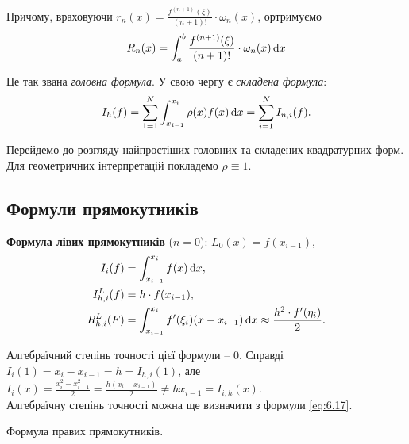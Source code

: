 Причому, враховуючи $r_n(x) = \frac{f^{(n + 1)}(\xi)}{(n + 1)!} \cdot \omega_n(x)$, ортримуємо
\begin{equation}
	\label{eq:6.12}
	R_n(x) = \int_a^b \frac{f^{(n + 1)}(\xi)}{(n + 1)!} \cdot \omega_n(x) \mathop{}\!\mathrm{d} x
\end{equation}

Це так звана \textit{головна формула}. У свою чергу є \textit{складена формула}:
\begin{equation}
	\label{eq:6.14}
	I_h(f) = \sum_{1 = 1}^N \int_{x_{i - 1}}^{x_i} \rho(x) f(x) \mathop{}\!\mathrm{d} x = \sum_{i = 1}^N I_{n, i}(f).
\end{equation}

Перейдемо до розгляду найпростіших головних та складених квадратурних форм. Для геометричних інтерпретацій покладемо $\rho \equiv 1$.

\subsection{Формули прямокутників}

\textbf{Формула лівих прямокутників} ($n = 0$): $L_0(x) = f(x_{i - 1})$, 
\begin{align}
	\label{eq:6.15}
	I_i(f) &= \int_{x_{i-1}}^{x_i} f(x) \mathop{}\!\mathrm{d} x, \\
	\label{eq:6.16}
	I_{h, i}^L (f) &= h \cdot f(x_{i - 1}), \\
	\label{eq:6.17}
	R_{h, i}^L (F) &= \int_{x_{i - 1}}^{x_i} f'(\xi_i) (x - x_{i - 1}) \mathop{}\!\mathrm{d} x \approx \frac{h^2 \cdot f'(\eta_i)}{2}.
\end{align}

Алгебраїчний степінь точності цієї формули -- 0. Справді
$I_i(1) = x_i - x_{i - 1} = h = I_{h, i} (1)$, але $I_i(x) = \frac{x_i^2 - x_{i - 1}^2}{2} = \frac{h(x_i + x_{i - 1})}{2} \ne h x_{i - 1} = I_{i, h}(x)$. \\

Алгебраїчну степінь точності можна ще визначити з формули \eqref{eq:6.17}.

\begin{problem}
	Формула правих прямокутників.
\end{problem}

\begin{solution}

\end{solution}


